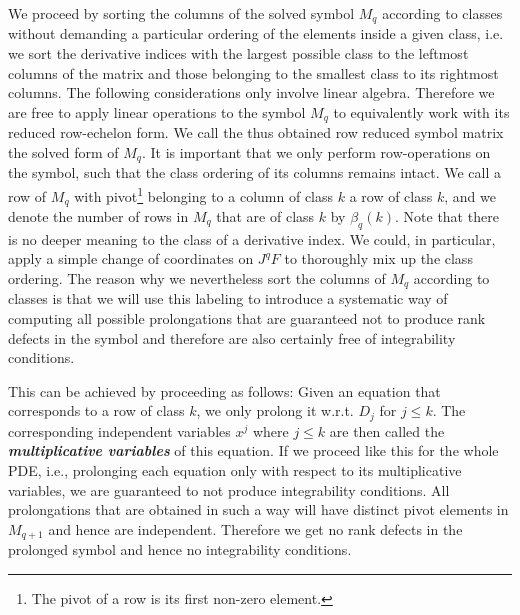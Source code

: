 We proceed by sorting the columns of the solved symbol $M_q$ according to classes without demanding a particular ordering of the elements inside a given class, i.e. we sort the derivative indices with the largest possible class to the leftmost columns of the matrix and those belonging to the smallest class to its rightmost columns.
The following considerations only involve linear algebra. Therefore we are free to apply linear operations to the symbol $M_q$ to equivalently work with its reduced row-echelon form. We call the thus obtained row reduced symbol matrix the solved form of $M_q$. 
It is important that we only perform row-operations on the symbol, such that the class ordering of its columns remains intact.
We call a row of $M_q$ with pivot\footnote{The pivot of a row is its first non-zero element.} belonging to a column of class $k$ a row of class $k$, and we denote the number of rows in $M_q$ that are of class $k$ by $\beta_q(k)$. Note that there is no deeper meaning to the class of a derivative index. We could, in particular, apply a simple change of coordinates on $J^qF$ to thoroughly mix up the class ordering. The reason why we nevertheless sort the columns of $M_q$ according to classes is that we will use this labeling to introduce a systematic way of computing all possible prolongations that are guaranteed not to produce rank defects in the symbol and therefore are also certainly free of integrability conditions.

This can be achieved by proceeding as follows:
Given an equation that corresponds to a row of class $k$, we only prolong it w.r.t. $D_j$ for  $j \leq k$. The corresponding independent variables $x^j$ where $j \leq k$ are then called the \textbf{\textit{multiplicative variables}} of this equation. If we proceed like this for the whole PDE, i.e., prolonging each equation only with respect to its multiplicative variables, we are guaranteed to not produce integrability conditions. All prolongations that are obtained in such a way will have distinct pivot elements in $M_{q+1}$ and hence are independent. Therefore we get no rank defects in the prolonged symbol and hence no integrability conditions.

